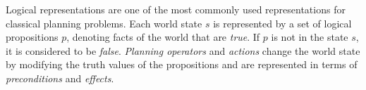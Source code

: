 





Logical representations are one of the most commonly used representations for classical planning problems. 
Each world state $s$ is represented by a set of logical propositions $p$, denoting facts of the world that are \textit{true}. 
If $p$ is not in the state $s$, it is considered to be \textit{false}.
\textit{Planning operators} and \textit{actions} change the world state by modifying the truth values of the propositions and are represented in terms of \textit{preconditions} and \textit{effects}.

